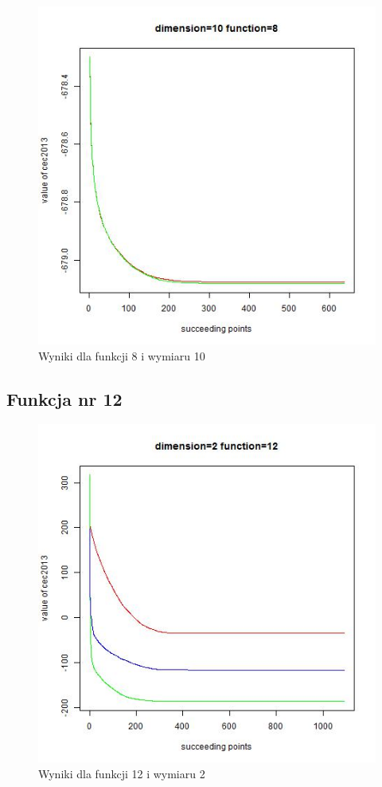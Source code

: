 \documentclass{article}
\begin{document}
\begin{figure}[H]
\centering
\includegraphics[scale=0.6]{dim_10__func_8}
\caption{Wyniki dla funkcji 8 i wymiaru 10}
\end{figure}

\subsection{Funkcja nr 12}


\begin{figure}[H]
\centering
\includegraphics[scale=0.6]{dim_2__func_12}
\caption{Wyniki dla funkcji 12 i wymiaru 2}
\end{figure}
\end{document}
